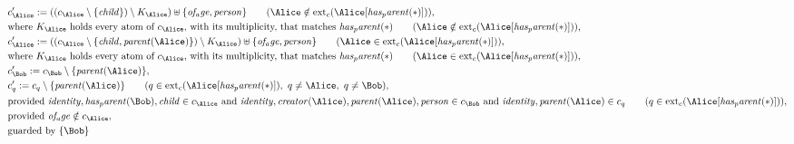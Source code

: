 \begin{align*}
&
c'_
{
\Alice
}
 := 
(
(c_
{
\Alice
}
 \setminus 
\{
\mathit{
child
}
\}
) \setminus K_
{
\Alice
}
) \uplus 
\{
\mathit{
of_age
}
,
\mathit{
person
}
\}
 \qquad (
\Alice
 \notin 
\mathrm{ext}_c(
\Alice
[
\mathit{
has_parent
}
(
\ast
)
]
)
)
,\\
&
\text{where } K_
{
\Alice
}
 \text{ holds every atom of } c_
{
\Alice
}
 \text{, with its multiplicity, that matches } 
\mathit{
has_parent
}
(
\ast
)
 \qquad (
\Alice
 \notin 
\mathrm{ext}_c(
\Alice
[
\mathit{
has_parent
}
(
\ast
)
]
)
)
,\\
&
c'_
{
\Alice
}
 := 
(
(c_
{
\Alice
}
 \setminus 
\{
\mathit{
child
}
,
\mathit{
parent
}
(
\Alice
)
\}
) \setminus K_
{
\Alice
}
) \uplus 
\{
\mathit{
of_age
}
,
\mathit{
person
}
\}
 \qquad (
\Alice
 \in 
\mathrm{ext}_c(
\Alice
[
\mathit{
has_parent
}
(
\ast
)
]
)
)
,\\
&
\text{where } K_
{
\Alice
}
 \text{ holds every atom of } c_
{
\Alice
}
 \text{, with its multiplicity, that matches } 
\mathit{
has_parent
}
(
\ast
)
 \qquad (
\Alice
 \in 
\mathrm{ext}_c(
\Alice
[
\mathit{
has_parent
}
(
\ast
)
]
)
)
,\\
&
c'_
{
\Bob
}
 := 
c_
{
\Bob
}
 \setminus 
\{
\mathit{
parent
}
(
\Alice
)
\}
,\\
&
c'_
q
 := 
c_
q
 \setminus 
\{
\mathit{
parent
}
(
\Alice
)
\}
 \qquad (
q
 \in 
\mathrm{ext}_c(
\Alice
[
\mathit{
has_parent
}
(
\ast
)
]
)
,\ 
q \neq 
\Alice
,\ 
q \neq 
\Bob
)
,\\
&
\text{provided } 
\mathit{
identity
}
,
\mathit{
has_parent
}
(
\Bob
)
,
\mathit{
child
}
 \in c_
{
\Alice
}
 \text{ and } 
\mathit{
identity
}
,
\mathit{
creator
}
(
\Alice
)
,
\mathit{
parent
}
(
\Alice
)
,
\mathit{
person
}
 \in c_
{
\Bob
}
 \text{ and } 
\mathit{
identity
}
,
\mathit{
parent
}
(
\Alice
)
 \in c_
q
 \qquad (
q \in 
\mathrm{ext}_c(
\Alice
[
\mathit{
has_parent
}
(
\ast
)
]
)
)
,\\
&
\text{provided } 
\mathit{
of_age
}
 \notin c_
{
\Alice
}
,\\
&
\text{guarded by } \{
\Bob
\}
\end{align*}
